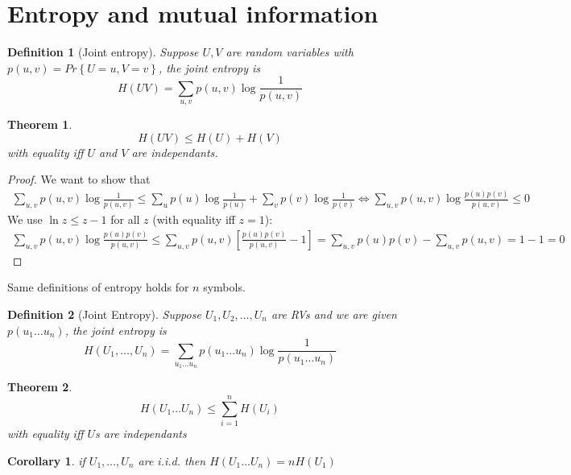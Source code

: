 \documentclass[twoside]{article}
\newtheorem{theorem}{Theorem}[section]
\newtheorem{corollary}{Corollary}[theorem]
\newtheorem{definition}{Definition}[section]
\theoremstyle{definition} %
\renewcommand{\Pr}[1]{Pr\left\{#1\right\}}
\begin{document}

\cleardoublepage
\section{Entropy and mutual information}
\label{sec:entropy}

\begin{definition}[Joint entropy]
  Suppose $U, V$ are random variables with $p(u,v) = \Pr{U=u, V=v}$, the joint entropy is
  \[
    H(UV) = \sum_{u,v} p(u,v) \log \frac 1 {p(u,v)}
  \]
\end{definition}

\begin{theorem}
  \[
    H(UV) \leq H(U) + H(V)
  \]
  with equality iff $U$ and $V$ are independants.
\end{theorem}

\begin{proof}
  We want to show that
  \begin{align*}
    \sum_{u,v} p(u,v) \log \frac 1 {p(u,v)} \leq \sum_u p(u) \log \frac 1 {p(u)} + \sum_v p(v) \log \frac 1 {p(v)}
    \iff \sum_{u,v} p(u,v) \log \frac {p(u)p(v)} {p(u,v)} \leq 0
  \end{align*}
  We use $\ln z \leq z - 1$ for all $z$ (with equality iff $z=1$):
  \begin{align*}
    \sum_{u,v} p(u,v) \log \frac {p(u)p(v)} {p(u,v)} \leq \sum_{u,v} p(u,v) \left[ \frac {p(u)p(v)} {p(u, v)} - 1 \right] = \sum_{u,v} p(u)p(v) - \sum_{u,v} p(u,v) = 1 - 1 = 0
  \end{align*}
\end{proof}

Same definitions of entropy holds for $n$ symbols.

\begin{definition}[Joint Entropy]
  Suppose $U_1, U_2, \dots, U_n$ are RVs and we are given $p(u_1 \dots u_n)$, the joint entropy is
  \[
    H(U_1, \dots, U_n) = \sum_{u_1 \dots u_n} p(u_1 \dots u_n) \log \frac 1 {p(u_1 \dots u_n)}
  \]
\end{definition}

\begin{theorem}
  \[
    H(U_1 \dots U_n) \leq \sum_{i=1}^n H(U_i)
  \]
  with equality iff $U$s are independants
\end{theorem}

\begin{corollary}
  if $U_1, \dots, U_n$ are i.i.d. then $H(U_1 \dots U_n) = nH(U_1)$
\end{corollary}
\end{document}
